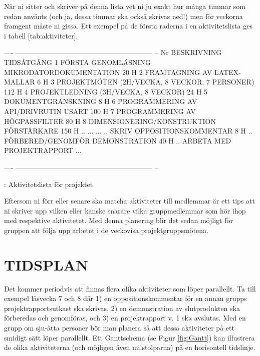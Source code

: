 \documentclass[a4paper]{article}
\begin{document}
När ni sitter och skriver på denna lista vet ni ju exakt hur många
timmar som redan använts (och ja, dessa timmar ska också skrivas ned!)
men för veckorna framgent måste ni gissa. Ett exempel på de första
raderna i en aktivitetslista ges i tabell [tab:aktiviteter].

  ---- ----------------------------------------------------------- --
  Nr   BESKRIVNING  TIDSÅTGÅNG                                    
       1  FÖRSTA GENOMLÄSNING MIKRODATORDOKUMENTATION  20 H      
       2  FRAMTAGNING AV LATEX-MALLAR  6 H                       
       3  PROJEKTMÖTEN (2H/VECKA, 8 VECKOR, 7 PERSONER)  112 H   
       4  PROJEKTLEDNING (3H/VECKA, 8 VECKOR)  24 H              
       5  DOKUMENTGRANSKNING  8 H                                
       6  PROGRAMMERING AV API/DRIVRUTIN USART  100 H            
       7  PROGRAMMERING AV HÖGPASSFILTER  80 H                   
       8  DIMENSIONERING/KONSTRUKTION FÖRSTÄRKARE  150 H         
       ..  ...  ...                                              
       ..  SKRIV OPPOSITIONSKOMMENTAR  8 H                       
       ..  FÖRBERED/GENOMFÖR DEMONSTRATION  40 H                 
       ..  ARBETA MED PROJEKTRAPPORT  ...                        
                                                                   
  ---- ----------------------------------------------------------- --

  : Aktivitetslista för projektet

Eftersom ni förr eller senare ska matcha aktiviteter till medlemmar är
ett tips att ni skriver upp vilken eller kanske snarare vilka
gruppmedlemmar som hör ihop med respektive aktivitetet. Med denna
planering blir det sedan möjligt för gruppen att följa upp arbetet i de
veckovisa projektgruppsmötena.



\section{TIDSPLAN}
\label{sec:tidsplan}

Det kommer periodvis att finnas flera olika aktiviteter som löper
parallellt. Ta till exempel läsvecka 7 och 8 där 1) en
oppositionskommentar för en annan grupps projektrapportsutkast ska
skrivas, 2) en demonstration av slutprodukten ska förberedas och
genomföras, och 3) en projektrapport v. 1 ska avslutas. Med en grupp om
sju-åtta personer bör man planera så att dessa aktiviteter på ett
smidigt sätt löper parallellt. Ett Ganttschema (se Figur \ref{fig:Gantt})
kan illustrera de olika aktiviteterna (och möjligen även milstolparna)
på en horisontell tidslinje.
\end{document}
